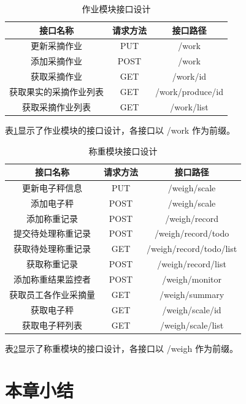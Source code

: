 \begin{table}[H]
\centering
\caption{作业模块接口设计}
\label{tab:interface-work}
\begin{tabular}{|c|c|c|}
\hline
接口名称 & 请求方法 & 接口路径 \\ \hline
更新采摘作业 & PUT & /work \\ \hline
添加采摘作业 & POST & /work \\ \hline
获取采摘作业 & GET & /work/{id} \\ \hline
获取果实的采摘作业列表 & GET & /work/produce/{id}\\ \hline
获取采摘作业列表 & GET & /work/list \\ \hline
\end{tabular}
\end{table}

表\ref{tab:interface-work}显示了作业模块的接口设计，各接口以 /work 作为前缀。

\begin{table}[H]
\centering
\caption{称重模块接口设计}
\label{tab:interface-weigh}
\begin{tabular}{|c|c|c|}
\hline
接口名称 & 请求方法 & 接口路径 \\\hline
更新电子秤信息 & PUT & /weigh/scale \\ \hline
添加电子秤 & POST & /weigh/scale \\\hline
添加称重记录 & POST & /weigh/record \\\hline
提交待处理称重记录 & POST & /weigh/record/todo \\\hline
获取待处理称重记录 & GET & /weigh/record/todo/list \\\hline
获取称重记录 & POST & /weigh/record/list \\\hline
添加称重结果监控者 & POST & /weigh/monitor \\\hline
获取员工各作业采摘量 & GET & /weigh/summary \\\hline
获取电子秤 & GET & /weigh/scale/{id} \\\hline
获取电子秤列表 & GET & /weigh/scale/list \\\hline
\end{tabular}
\end{table}

表\ref{tab:interface-weigh}显示了称重模块的接口设计，各接口以 /weigh 作为前缀。

\section{本章小结}
